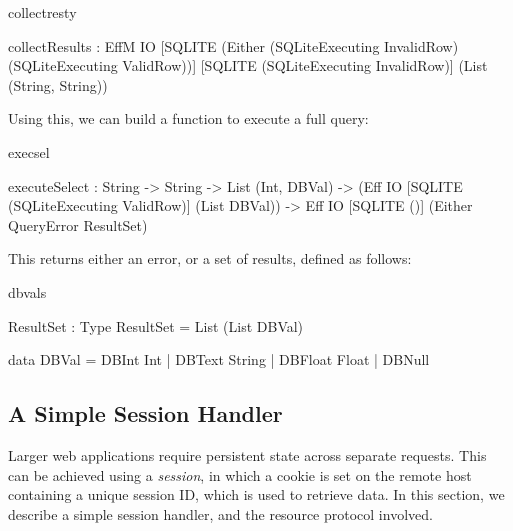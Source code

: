 \begin{SaveVerbatim}{collectresty}

collectResults :
  EffM IO [SQLITE (Either (SQLiteExecuting InvalidRow) 
                          (SQLiteExecuting ValidRow))] 
          [SQLITE (SQLiteExecuting InvalidRow)] 
          (List (String, String))
\end{SaveVerbatim}


\noindent
{}

\noindent
{}

\noindent
Using this, we can build a function to execute a full query:

\begin{SaveVerbatim}{execsel}

executeSelect : 
  String -> String -> List (Int, DBVal) -> 
  (Eff IO [SQLITE (SQLiteExecuting ValidRow)] 
               (List DBVal)) -> 
  Eff IO [SQLITE ()] (Either QueryError ResultSet)
 
\end{SaveVerbatim}

\noindent
This returns either an error, or a set of results, defined
as follows:

\begin{SaveVerbatim}{dbvals}

ResultSet : Type
ResultSet = List (List DBVal)

data DBVal = DBInt Int     | DBText String
           | DBFloat Float | DBNull

\end{SaveVerbatim}


\subsection{A Simple Session Handler}
Larger web applications require persistent state across separate
requests. This can be achieved using a \textit{session},
in which a cookie is set on the remote host containing a unique session ID,
which is used to retrieve data. In this section, we describe
a simple session handler, and the resource protocol
involved. 

